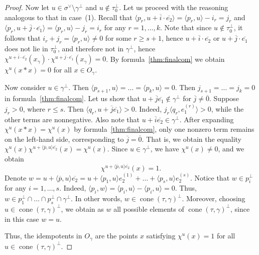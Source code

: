 \documentclass[10pt,a4paper]{amsart}
\DeclareMathOperator{\cone}{cone}
\newcommand{\ol}[1]{\overline{#1}}
\begin{document}
\begin{proof}
Now let $u \in \sigma^\vee \setminus \gamma^\perp$ and $u \notin \tau_0^\perp$. Let us proceed with the reasoning analogous to that in case~(1). Recall that $\langle p_r, u + \ol{i}\cdot \ol{e_2} \rangle = \langle p_r, u \rangle - i_r = j_r$ and $\langle p_r, u + \ol{j}\cdot \ol{e_1} \rangle = \langle p_r, u \rangle - j_r = i_r$ for any $r = 1, \ldots, k$. Note that since $u \notin \tau_0^\perp$, it follows that $i_r + j_r = \langle p_r, u \rangle \neq 0$ for some $r \geq s+1$, hence $u + \ol{i}\cdot \ol{e_2}$ or $u + \ol{j}\cdot \ol{e_1}$ does not lie in $\tau_0^\perp$, and therefore not in $\gamma^\perp$, hence $\chi^{u + \ol{i}\cdot \ol{e_2}}(x_\gamma) \cdot \chi^{u + \ol{j}\cdot \ol{e_1}}(x_\gamma) = 0$. By formula~\eqref{thm:finalcom} we obtain $\chi^u(x*x) = 0$ for all $x \in O_\gamma$.

Now consider $u \in \gamma^\perp$. Then $\langle p_{s+1}, u \rangle = \ldots = \langle p_{k}, u \rangle = 0$. Then $j_{s+1} = \ldots = j_k = 0$ in formula~\eqref{thm:finalcom}. Let us show that $u + \ol{j} \ol{e_1} \notin \gamma^\perp$ for $\ol{j} \neq \ol{0}$. Suppose $j_r > 0$, where $r \leq s$. Then $\langle q_r, u + \ol{j} \ol{e_1} \rangle > 0$. Indeed, $j_r \langle q_r, e_1^{(r)} \rangle > 0$, while the other terms are nonnegative. Also note that $u + \ol{i} \ol{e_2} \in \gamma^\perp$. After expanding $\chi^u(x*x) = \chi^u(x)$ by formula~\eqref{thm:finalcom}, only one nonzero term remains on the left-hand side, corresponding to $\ol{j} = \ol{0}$. That is, we obtain the equality $\chi^u(x)\chi^{u + \langle \ol{p}, u \rangle \ol{e_2}}(x) = \chi^u(x)$. Since $u \in \gamma^\perp$, we have $\chi^u(x) \neq 0$, and we obtain $$\chi^{u + \langle \ol{p}, u \rangle \ol{e_2}}(x) = 1.$$ Denote $w = u + \langle \ol{p}, u \rangle \ol{e_2} = u + \langle p_1, u \rangle e_2^{(1)} + \ldots + \langle p_s, u \rangle e_2^{(s)}$. Notice that $w \in p_i^\perp$ for any $i = 1, \ldots, s$. Indeed, $\langle p_i, w \rangle = \langle p_i, u \rangle - \langle p_i, u \rangle = 0$. Thus, $w \in p_1^\perp \cap \ldots \cap p_s^\perp \cap \gamma^\perp$. In other words, $w \in \cone(\tau, \gamma)^\perp$. Moreover, choosing $u \in \cone(\tau, \gamma)^\perp$, we obtain as $w$ all possible elements of $\cone(\tau, \gamma)^\perp$, since in this case $w = u$.

Thus, the idempotents in $O_\gamma$ are the points $x$ satisfying $\chi^u(x) = 1$ for all $u \in \cone(\tau, \gamma)^\perp$.
\end{proof}
\end{document}
